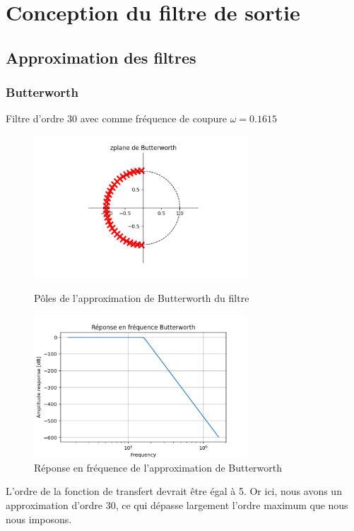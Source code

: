 \documentclass[a4paper,12pt,oneside]{report}	%
\begin{document}
\chapter{Conception du filtre de sortie}
    \section{Approximation des filtres}
\newpage
        \subsection{Butterworth}
            Filtre d'ordre 30 avec comme fréquence de coupure $\omega = 0.1615$
            \begin{figure}[h!]
                \centering
                \includegraphics[width = 8cm]{images/2.0.0 - zplane de Butterworth.png}
                \caption{Pôles de l'approximation de Butterworth du filtre}
                \label{fig:zplane-Butterworth}
                \includegraphics[width = 8cm]{images/2.0.0 - Réponse en fréquence Butterworth.png}
                \caption{Réponse en fréquence de l'approximation de Butterworth}
                \label{fig:repfreq-Butterworth}
            \end{figure}
            
            L'ordre de la fonction de transfert devrait être égal à 5. Or ici, nous avons un approximation d'ordre 30, ce qui dépasse largement l'ordre maximum que nous nous imposons.
\newpage
\end{document}
